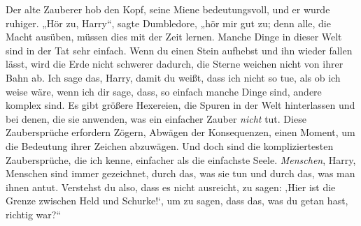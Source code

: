 Der alte Zauberer hob den Kopf, seine Miene bedeutungsvoll, und er wurde ruhiger.
„Hör zu, Harry“, sagte Dumbledore, „hör mir gut zu; denn alle, die Macht ausüben, müssen dies mit der Zeit lernen. Manche Dinge in dieser Welt sind in der Tat sehr einfach. Wenn du einen Stein aufhebst und ihn wieder fallen lässt, wird die Erde nicht schwerer dadurch, die Sterne weichen nicht von ihrer Bahn ab. Ich sage das, Harry, damit du weißt, dass ich nicht so tue, als ob ich weise wäre, wenn ich dir sage, dass, so einfach manche Dinge sind, andere komplex sind. Es gibt größere Hexereien, die Spuren in der Welt hinterlassen und bei denen, die sie anwenden, was ein einfacher Zauber \emph{nicht} tut. Diese Zaubersprüche erfordern Zögern, Abwägen der Konsequenzen, einen Moment, um die Bedeutung ihrer Zeichen abzuwägen. Und doch sind die kompliziertesten Zaubersprüche, die ich kenne, einfacher als die einfachste Seele. \emph{Menschen}, Harry, Menschen sind immer gezeichnet, durch das, was sie tun und durch das, was man ihnen antut. Verstehst du also, dass es nicht ausreicht, zu sagen: ‚Hier ist die Grenze zwischen Held und Schurke!‘, um zu sagen, dass das, was du getan hast, richtig war?“

